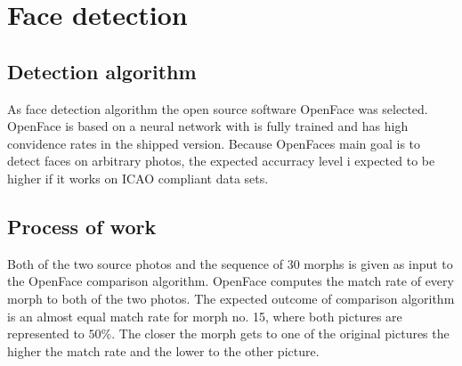 \section{Face detection}

\subsection*{Detection algorithm} %
As face detection algorithm the open source software OpenFace was selected. OpenFace is based on a neural network with is fully trained and has high convidence rates in the shipped version. Because OpenFaces main goal is to detect faces on arbitrary photos, the expected accurracy level i expected to be higher if it works on ICAO compliant data sets. 

\subsection*{Process of work}
Both of the two source photos and the sequence of 30 morphs is given as input to the OpenFace comparison algorithm. OpenFace computes the match rate of every morph to both of the two photos. 
The expected outcome of comparison algorithm is an almost equal match rate for morph no. 15, where both pictures are represented to $50\%$. The closer the morph gets to one of the original pictures the higher the match rate and the lower to the other picture. 




